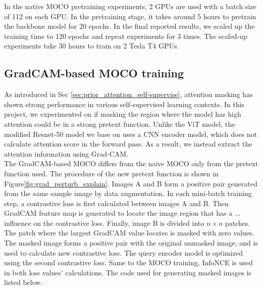 \documentclass[12pt,twoside]{report}
\begin{document}
In the native MOCO pretraining experiments, 2 GPUs are used with a batch size of 112 on each GPU. In the pretraining stage, it takes around 5 hours to pretrain the backbone model for 20 epochs. In the final reported results, we scaled up the training time to 120 epochs and repeat experiments for 3 times. The scaled-up experiments take 30 hours to train on 2 Tesla T4 GPUs. 


\subsection{GradCAM-based MOCO training}
As introduced in Sec \ref{sec:prior_attention_self-supervise}, attention masking has shown strong performance in various self-supervised learning contexts. In this project, we experimented on if masking the region where the model has high attention could be in a strong pretext function. Unlike the ViT model, the modified Resnet-50 model we base on uses a CNN encoder model, which does not calculate attention score in the forward pass. As a result, we instead extract the attention information using Grad-CAM. \\





The GradCAM-based MOCO differs from the naive MOCO only from the pretext function used. The procedure of the new pretext function is shown in Figure\ref{fig:grad_perturb_explain}. Images A and B form a positive pair generated from the same sample image by data augmentation. In each mini-batch training step, a contrastive loss is first calculated between images A and B. Then GradCAM feature map is generated to locate the image region that has a ... influence on the contrastive loss. Finally, image B is divided into $n \times n$ patches. The patch where the largest GradCAM value locates is masked with zero values. The masked image forms a positive pair with the original unmasked image, and is used to calculate new contrastive loss. The query encoder model is optimized using the second contrastive loss. Same to the MOCO training, InfoNCE is used in both loss values' calculations. The code used for generating masked images is listed below. 
\end{document}
